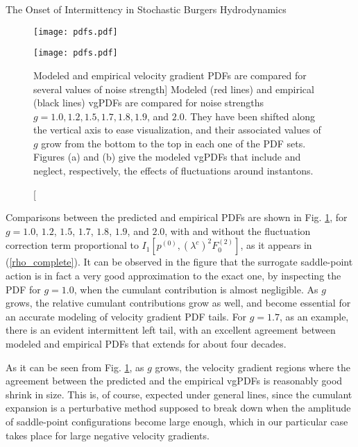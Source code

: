 \begin{chapter}{The Onset of Intermittency in Stochastic Burgers Hydrodynamics}
\begin{figure}[t]
    \centering
    \begin{minipage}{0.5\textwidth}
        \centering
        \texttt{[image: pdfs.pdf]} %
    \end{minipage}\hfill
    \begin{minipage}{0.5\textwidth}
        \centering
        \texttt{[image: pdfs.pdf]} %
    \end{minipage}
    \caption
    [Modeled and empirical velocity gradient PDFs are compared for several values of noise strength]
    {Modeled (red lines) and empirical (black lines) vgPDFs are compared for noise strengths $g=1.0, 1.2, 1.5, 1.7, 1.8, 1.9$, and $2.0$. They have been shifted along the vertical axis to ease visualization, and their associated values of $g$ grow from the bottom to the top in each one of the PDF sets. Figures (a) and (b) give the modeled vgPDFs that include and neglect, respectively, the effects of fluctuations around instantons.}
    \label{vgPDFs}
\end{figure}

Comparisons between the predicted and empirical PDFs are shown in Fig. \ref{vgPDFs}, for $g=1.0$, $1.2$, $1.5$, $1.7$, $1.8$, $1.9$, and $2.0$, with and without the fluctuation correction term proportional to $I_1 [p^{(0)},(\lambda^c)^2 F_0^{(2)}]$, as it appears in (\ref{rho_complete}).
It can be observed in the figure that the surrogate saddle-point action is in fact a very good approximation to the exact one, by inspecting the PDF for $g=1.0$, when the cumulant contribution is almost negligible. As $g$ grows, the relative cumulant contributions grow as well, and become essential for an accurate modeling of velocity gradient PDF tails. For $g=1.7$, as an example, there is an evident intermittent left tail, with an excellent agreement between modeled and empirical PDFs that extends for about four decades.

As it can be seen from Fig. \ref{vgPDFs}, as $g$ grows, the velocity gradient regions where the agreement between the predicted and the empirical vgPDFs is reasonably good shrink in size. This is, of course, expected under general lines, since the cumulant expansion is a perturbative method supposed to break down when the amplitude of saddle-point configurations become large enough, which in our particular case takes place for large negative velocity gradients.


\end{chapter}
